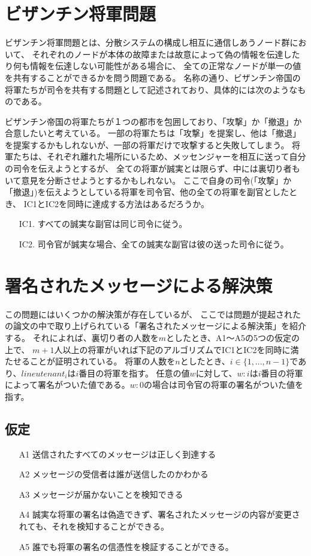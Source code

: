 \section{ビザンチン将軍問題}
ビザンチン将軍問題とは、分散システムの構成し相互に通信しあうノード群において、
それぞれのノードが本体の故障または故意によって偽の情報を伝達したり何も情報を伝達しない可能性がある場合に、
全ての正常なノードが単一の値を共有することができるかを問う問題である。\cite{lamport1982}
名称の通り、ビザンチン帝国の将軍たちが司令を共有する問題として記述されており、具体的には次のようなものである。

ビザンチン帝国の将軍たちが１つの都市を包囲しており、「攻撃」か「撤退」か合意したいと考えている。
一部の将軍たちは「攻撃」を提案し、他は「撤退」を提案するかもしれないが、一部の将軍だけで攻撃すると失敗してしまう。
将軍たちは、それぞれ離れた場所にいるため、メッセンジャーを相互に送って自分の司令を伝えようとするが、
全ての将軍が誠実とは限らず、中には裏切り者もいて意見を分断させようとするかもしれない。
ここで自身の司令(「攻撃」か「撤退」)を伝えようとしている将軍を司令官、他の全ての将軍を副官としたとき、
IC1とIC2を同時に達成する方法はあるだろうか。

\begin{itemize}
  \item[IC1.] すべての誠実な副官は同じ司令に従う。
  \item[IC2.] 司令官が誠実な場合、全ての誠実な副官は彼の送った司令に従う。
\end{itemize}

\section{署名されたメッセージによる解決策}
この問題にはいくつかの解決策が存在しているが、
ここでは問題が提起されたの論文の中で取り上げられている「署名されたメッセージによる解決策」を紹介する。
それによれば、裏切り者の人数を$m$としたとき、A1〜A5の5つの仮定の上で、
$m+1$人以上の将軍がいれば下記のアルゴリズムでIC1とIC2を同時に満たせることが証明されている。
将軍の人数を$n$としたとき、$i \in \{1,...,n-1\}$であり、$lineutenant_i$は$i$番目の将軍を指す。
任意の値$w$に対して、$w:i$は$i$番目の将軍によって署名がついた値である。$w:0$の場合は司令官の将軍の署名がついた値を指す。

\subsection{仮定}
\begin{itemize}
  \item[A1] 送信されたすべてのメッセージは正しく到達する
  \item[A2] メッセージの受信者は誰が送信したのかわかる
  \item[A3] メッセージが届かないことを検知できる
  \item[A4] 誠実な将軍の署名は偽造できず、署名されたメッセージの内容が変更されても、それを検知することができる。
  \item[A5] 誰でも将軍の署名の信憑性を検証することができる。
\end{itemize}

